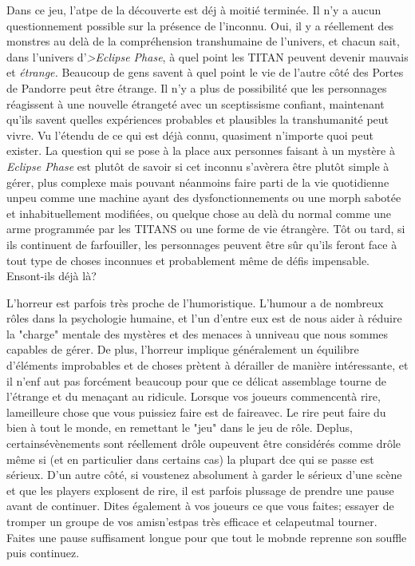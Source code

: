 Dans ce jeu, l'atpe de la découverte est déj à moitié terminée. Il n'y a aucun questionnement possible sur la présence de l'inconnu. Oui, il y a réellement des monstres au delà de la compréhension transhumaine de l'univers, et chacun sait, dans l'univers d'\textit{>Eclipse Phase}, à quel point  les TITAN peuvent devenir mauvais et \textit{étrange.} Beaucoup de gens savent à quel point le vie de l'autre côté des Portes de Pandorre peut être étrange. Il n'y a plus de possibilité que les personnages réagissent à une nouvelle étrangeté avec un sceptissisme confiant, maintenant qu'ils savent quelles expériences probables et plausibles la transhumanité peut vivre. Vu l'étendu de ce qui est déjà connu, quasiment n'importe quoi peut exister. La question qui se pose à la place aux personnes faisant à un mystère à \textit{Eclipse Phase} est plutôt de savoir si cet inconnu s'avèrera être plutôt simple à gérer, plus complexe mais pouvant néanmoins faire parti de la vie quotidienne unpeu comme une machine ayant des dysfonctionnements ou une morph sabotée et inhabituellement modifiées, ou quelque chose au delà du normal comme une arme programmée par les TITANS ou une forme de vie étrangère. Tôt ou tard, si ils continuent de farfouiller, les personnages peuvent être sûr qu'ils feront face à tout type de choses inconnues et probablement même de défis impensable. Ensont-ils déjà là? 

L'horreur est parfois très proche de l'humoristique. L'humour a de nombreux rôles dans la psychologie humaine, et l'un d'entre eux est de nous aider à réduire la "charge" mentale des mystères et des menaces à unniveau que nous sommes capables de gérer. De plus, l'horreur implique généralement un équilibre d'éléments improbables et de choses prètent à dérailler de manière intéressante, et il n'enf aut pas forcément beaucoup pour que ce délicat assemblage tourne de l'étrange et du menaçant au ridicule. Lorsque vos joueurs commencentà rire, lameilleure chose que vous puissiez faire est de faireavec. Le rire peut faire du bien à tout le monde, en remettant le "jeu" dans le jeu de rôle. Deplus, certainsévènements sont réellement drôle oupeuvent être considérés comme drôle même si (et en particulier dans certains cas) la plupart dce qui se passe est sérieux. D'un autre côté, si voustenez absolument à garder le sérieux d'une scène et que les players explosent de rire, il est parfois plussage de prendre une pause avant de continuer. Dites également à vos joueurs ce que vous faites; essayer de tromper un groupe de vos amisn'estpas très efficace et celapeutmal tourner. Faites une pause suffisament longue pour que tout le mobnde reprenne son souffle puis continuez. 

